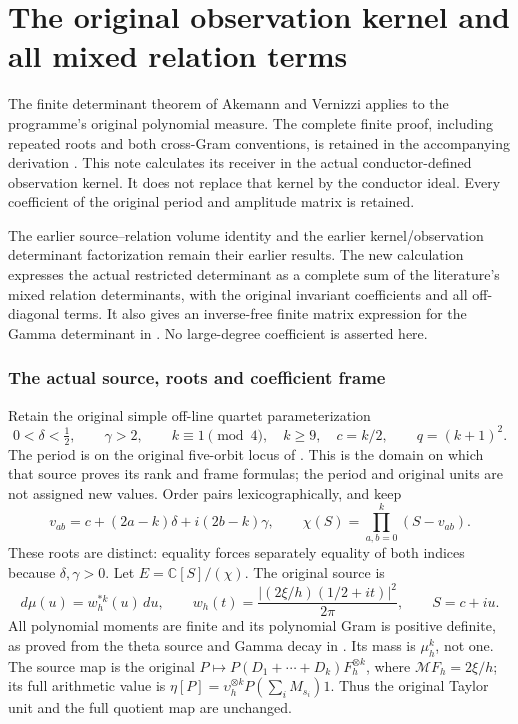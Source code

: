 

\clearpage\begingroup
\part*{The original observation kernel and all mixed relation terms}
\newcommand{\mrrootC}{\mathbb C}
\newcommand{\mrrootR}{\mathbb R}


The finite determinant theorem of Akemann and Vernizzi
\cite[\texttt{Th}, \texttt{Ddef}, \texttt{deg}]{mrroot:AV} applies to the
programme's original polynomial measure. The complete finite proof,
including repeated roots and both cross-Gram conventions, is retained
in the accompanying derivation \cite{mrroot:Mixed}. This note calculates its
receiver in the actual conductor-defined observation kernel. It does
not replace that kernel by the conductor ideal. Every coefficient of
the original period and amplitude matrix is retained.

The earlier source--relation volume identity \cite[(11)--(16)]{mrroot:Toda}
and the earlier kernel/observation determinant factorization
\cite[FW37--40]{mrroot:FW} remain their earlier results. The new calculation
expresses the actual restricted determinant as a complete sum of the
literature's mixed relation determinants, with the original invariant
coefficients and all off-diagonal terms. It also gives an inverse-free
finite matrix expression for the Gamma determinant in
\cite[JM21--28]{mrroot:JM}. No large-degree coefficient is asserted here.

\section{The actual source, roots and coefficient frame}
Retain the original simple off-line quartet parameterization
\[
 0<\delta<\tfrac12,\qquad \gamma>2,\qquad
 k\equiv1\pmod4,\quad k\ge9,\quad c=k/2,
 \qquad q=(k+1)^2.
 \tag{MR1}
\]
The period is on the original five-orbit locus of \cite{mrroot:OCF}.
This is the domain on which that source proves its rank and frame
formulas; the period and original units are not assigned new values.
Order pairs lexicographically, and keep
\[
 v_{ab}=c+(2a-k)\delta+i(2b-k)\gamma,
 \qquad \chi(S)=\prod_{a,b=0}^k(S-v_{ab}).\tag{MR2}
\]
These roots are distinct: equality forces separately equality of both
indices because $\delta,\gamma>0$. Let $E=\mrrootC[S]/(\chi)$.
The original source is
\[
 d\mu(u)=w_h^{*k}(u)\,du,\qquad
 w_h(t)=\frac{|(2\xi/h)(1/2+it)|^2}{2\pi},\qquad S=c+iu.
 \tag{MR3}
\]
All polynomial moments are finite and its polynomial Gram is positive
definite, as proved from the theta source and Gamma decay in
\cite{mrroot:Toda,mrroot:Mixed}. Its mass is $\mu_h^k$, not one.
The source map is the original
$P\mapsto P(D_1+\cdots+D_k)F_h^{\otimes k}$, where
$\mathcal MF_h=2\xi/h$; its full arithmetic value is
$\eta[P]=\upsilon_h^{\otimes k}P(\sum_iM_{s_i})1$.
Thus the original Taylor unit and the full quotient map are unchanged.

